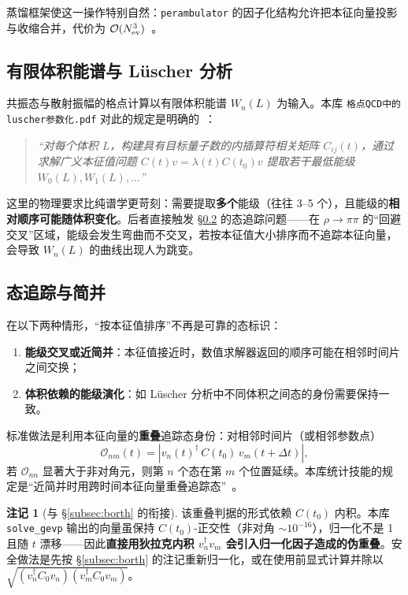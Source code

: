 \documentclass[12pt,a4paper]{ctexart}
\theoremstyle{definition}
\newtheorem{remark}{注记}[section]
\newcommand{\Order}{\mathcal{O}}
\newcommand{\dagg}{\dagger}
\newcommand{\code}[1]{\texttt{#1}}
\newcommand{\docCross}[1]{\texttt{#1}}
\begin{document}
蒸馏框架使这一操作特别自然：\code{perambulator} 的因子化结构允许把本征向量投影与收缩合并，代价为 $\Order(N_{\rm ev}^3)$~\cite{threepoint2026,Distillation2009}。

\subsection{有限体积能谱与 Lüscher 分析}

共振态与散射振幅的格点计算以有限体积能谱 $W_n(L)$ 为输入。本库 \docCross{格点QCD中的luscher参数化.pdf} 对此的规定是明确的~\cite{luscher2026}：

\begin{quote}
\emph{``对每个体积 $L$，构建具有目标量子数的内插算符相关矩阵 $C_{ij}(t)$，通过求解广义本征值问题 $C(t)v = \lambda(t)C(t_0)v$ 提取若干最低能级 $W_0(L), W_1(L),\dots$''}~\cite{luscher2026}
\end{quote}

这里的物理要求比纯谱学更苛刻：需要提取\textbf{多个}能级（往往 3--5 个），且能级的\textbf{相对顺序可能随体积变化}。后者直接触发 §\ref{subsec:statetracking} 的态追踪问题——在 $\rho\to\pi\pi$ 的``回避交叉''区域，能级会发生弯曲而不交叉，若按本征值大小排序而不追踪本征向量，会导致 $W_n(L)$ 的曲线出现人为跳变。

\subsection{态追踪与简并}\label{subsec:statetracking}

在以下两种情形，``按本征值排序''不再是可靠的态标识：

\begin{enumerate}[nosep]
    \item \textbf{能级交叉或近简并}：本征值接近时，数值求解器返回的顺序可能在相邻时间片之间交换；
    \item \textbf{体积依赖的能级演化}：如 Lüscher 分析中不同体积之间态的身份需要保持一致。
\end{enumerate}

标准做法是利用本征向量的\textbf{重叠}追踪态身份：对相邻时间片（或相邻参数点）
\begin{equation}
\mathcal{O}_{nm}(t) = |v_n(t)^\dagg\, C(t_0)\, v_m(t+\Delta t)| ,
\end{equation}
若 $\mathcal{O}_{nn}$ 显著大于非对角元，则第 $n$ 个态在第 $m$ 个位置延续。本库统计技能的规定是``近简并时用跨时间本征向量重叠追踪态''~\cite{pyqcdStatistics}。

\begin{remark}[与 §\ref{subsec:borth} 的衔接]
该重叠判据的形式依赖 $C(t_0)$ 内积。本库 \code{solve\_gevp} 输出的向量虽保持 $C(t_0)$-正交性（非对角 $\sim10^{-16}$），归一化不是 1 且随 $t$ 漂移——因此\textbf{直接用狄拉克内积 $v_n^\dagg v_m$ 会引入归一化因子造成的伪重叠}。安全做法是先按 §\ref{subsec:borth} 的注记重新归一化，或在使用前显式计算并除以 $\sqrt{(v_n^\dagg C_0 v_n)(v_m^\dagg C_0 v_m)}$。
\end{remark}
\end{document}

